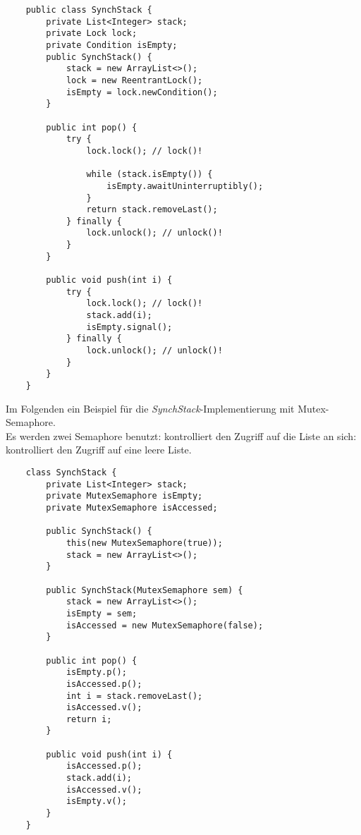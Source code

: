 \begin{verbatim}
    public class SynchStack {
        private List<Integer> stack;
        private Lock lock;
        private Condition isEmpty;
        public SynchStack() {
            stack = new ArrayList<>();
            lock = new ReentrantLock();
            isEmpty = lock.newCondition();
        }

        public int pop() {
            try {
                lock.lock(); // lock()!

                while (stack.isEmpty()) {
                    isEmpty.awaitUninterruptibly();
                }
                return stack.removeLast();
            } finally {
                lock.unlock(); // unlock()!
            }
        }

        public void push(int i) {
            try {
                lock.lock(); // lock()!
                stack.add(i);
                isEmpty.signal();
            } finally {
                lock.unlock(); // unlock()!
            }
        }
    }
\end{verbatim}

\noindent
Im Folgenden ein Beispiel für die \textit{SynchStack}-Implementierung mit Mutex-Semaphore.\\
Es werden zwei Semaphore benutzt:  kontrolliert den Zugriff auf die Liste an sich:  kontrolliert den Zugriff auf eine leere Liste.

\begin{verbatim}
    class SynchStack {
        private List<Integer> stack;
        private MutexSemaphore isEmpty;
        private MutexSemaphore isAccessed;

        public SynchStack() {
            this(new MutexSemaphore(true));
            stack = new ArrayList<>();
        }

        public SynchStack(MutexSemaphore sem) {
            stack = new ArrayList<>();
            isEmpty = sem;
            isAccessed = new MutexSemaphore(false);
        }

        public int pop() {
            isEmpty.p();
            isAccessed.p();
            int i = stack.removeLast();
            isAccessed.v();
            return i;
        }

        public void push(int i) {
            isAccessed.p();
            stack.add(i);
            isAccessed.v();
            isEmpty.v();
        }
    }
\end{verbatim}
